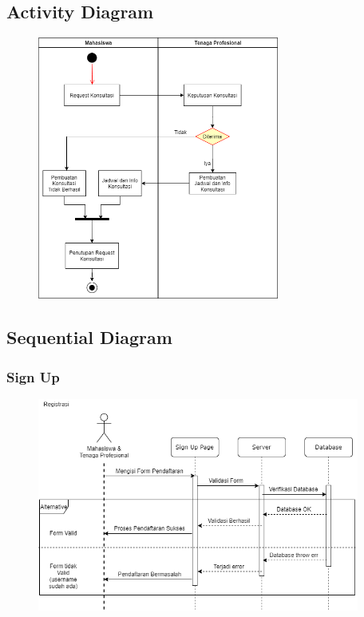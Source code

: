 \documentclass{article}
\begin{document}
	\subsection{Activity Diagram}
	\begin{figure}[H]
		\centering
		\includegraphics[width=300px]{Activity Diagram.png}
	\end{figure}

	\subsection{Sequential Diagram}
	\subsubsection{Sign Up}
	\begin{figure}[H]
		\centering
		\includegraphics[width=400px]{seq Sign Up.png}
	\end{figure}
\end{document}
